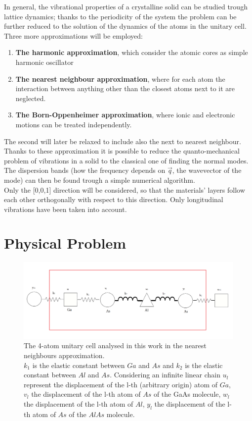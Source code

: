 \documentclass{article}
\begin{document}
In general, the vibrational properties of a crystalline solid can be studied trough lattice dynamics; thanks to the periodicity of the system the problem can be further reduced to the solution of the dynamics of the atoms in the unitary cell.\\
	Three more approximations will be employed:
	\begin{enumerate}
		\item \textbf{The harmonic approximation}, which consider the atomic cores as simple harmonic oscillator
		\item \textbf{The nearest neighbour approximation}, where for each atom the interaction between anything other than the closest atoms next to it are neglected.
		\item \textbf{The Born-Oppenheimer approximation}, where ionic and electronic motions can be treated independently.
	\end{enumerate}
	The second will later be relaxed to include also the next to nearest neighbour.\\
	Thanks to these approximation it is possible to reduce the quanto-mechanical problem of vibrations in a solid to the classical one of finding the normal modes. The dispersion bands (how the frequency depends on $\vec{q}$, the wavevector of the mode) can then be found trough a simple numerical algorithm.\\
Only the [0,0,1] direction will be considered, so that the materials' layers follow each other orthogonally with respect to this direction. Only longitudinal vibrations have been taken into account. \\

	\section{Physical Problem}

\begin{figure}
	\centering
	\includegraphics[width=0.7\linewidth]{cella.png}
	\caption{The 4-atom unitary cell analysed in this work in the nearest neighbours approximation.\\
	$k_1$ is the elastic constant between $Ga$ and $As$ and $k_2$ is the elastic constant between $Al$ and $As$. Considering an infinite linear chain $u_l$ represent the displacement of the l-th (arbitrary origin) atom of $Ga$, $v_l$ the displacement of the l-th atom of $As$ of the GaAs molecule, $w_l$ the displacement of the l-th atom of $Al$, $y_l$ the displacement of the l-th atom of $As$ of the $AlAs$ molecule.   }
	\label{fig:cella}
\end{figure}
\end{document}
